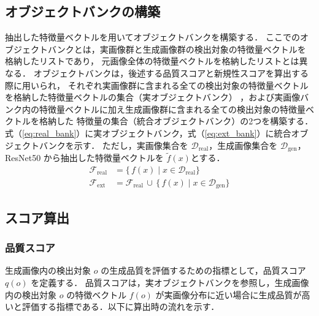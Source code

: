 \documentclass[Japanese]{dicomopapers}
\begin{document}
  \subsection{オブジェクトバンクの構築}

  抽出した特徴量ベクトルを用いてオブジェクトバンクを構築する．
  ここでのオブジェクトバンクとは，実画像群と生成画像群の検出対象の特徴量ベクトルを格納したリストであり，
  元画像全体の特徴量ベクトルを格納したリストとは異なる．
  オブジェクトバンクは，後述する品質スコアと新規性スコアを算出する際に用いられ，
  それぞれ実画像群に含まれる全ての検出対象の特徴量ベクトルを格納した特徴量ベクトルの集合（実オブジェクトバンク）
  ，および実画像バンク内の特徴量ベクトルに加え生成画像群に含まれる全ての検出対象の特徴量ベクトルを格納した
  特徴量の集合（統合オブジェクトバンク）の2つを構築する．
  式（\ref{eq:real_bank}）に実オブジェクトバンク，式（\ref{eq:ext_bank}）に統合オブジェクトバンクを示す．
  ただし，実画像集合を $\mathcal{D}_{\mathrm{real}}$，生成画像集合を $\mathcal{D}_{\mathrm{gen}}$，
  ResNet50 から抽出した特徴量ベクトルを $\tilde f(x)$とする．
  \begin{align}
    \mathcal{F}_{\mathrm{real}}
    &= \bigl\{\, f(x) \mid x \in \mathcal{D}_{\mathrm{real}}\bigr\}
    \label{eq:real_bank}\\
    \mathcal{F}_{\mathrm{ext}}
    &= \mathcal{F}_{\mathrm{real}}
      \,\cup\,
      \bigl\{\, f(x) \mid x \in \mathcal{D}_{\mathrm{gen}}\bigr\}
    \label{eq:ext_bank}
  \end{align}
  \subsection{スコア算出}
     \subsubsection{品質スコア}

     生成画像内の検出対象 \(o\) の生成品質を評価するための指標として，品質スコア \(q(o)\) を定義する．
     品質スコアは，実オブジェクトバンクを参照し，生成画像内の検出対象 \(o\) の特徴ベクトル \(f(o)\)
     が実画像分布に近い場合に生成品質が高いと評価する指標である．以下に算出時の流れを示す．
\end{document}
